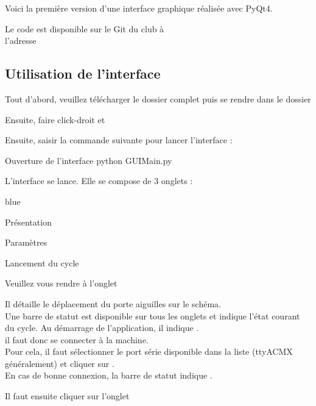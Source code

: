 {Voici la première version d'une interface graphique réalisée avec PyQt4.

Le code est disponible sur le Git du club à \\
l'adresse 

\subsection{Utilisation de l'interface}

Tout d'abord, veuillez télécharger le dossier complet puis se rendre dans le dossier 

Ensuite, faire click-droit et 

Ensuite, saisir la commande suivante pour lancer l'interface : 

\begin{Bash}{Ouverture de l'interface}
python GUIMain.py
\end{Bash}

L'interface se lance. Elle se compose de 3 onglets : 

\begin{items}{blue}{\Triangle}
    \item Présentation
    \item Paramètres
    \item Lancement du cycle
\end{items}

Veuillez vous rendre à l'onglet 


Il détaille le déplacement du porte aiguilles sur le schéma.\\

Une barre de statut est disponible sur tous les onglets et indique l'état courant du cycle. Au démarrage de l'application, il indique .\\

il faut donc se connecter à la machine.\\
Pour cela, il faut sélectionner le port série disponible dans la liste (ttyACMX généralement) et cliquer sur .\\
En cas de bonne connexion, la barre de statut indique .


Il faut ensuite cliquer sur l'onglet 

}
